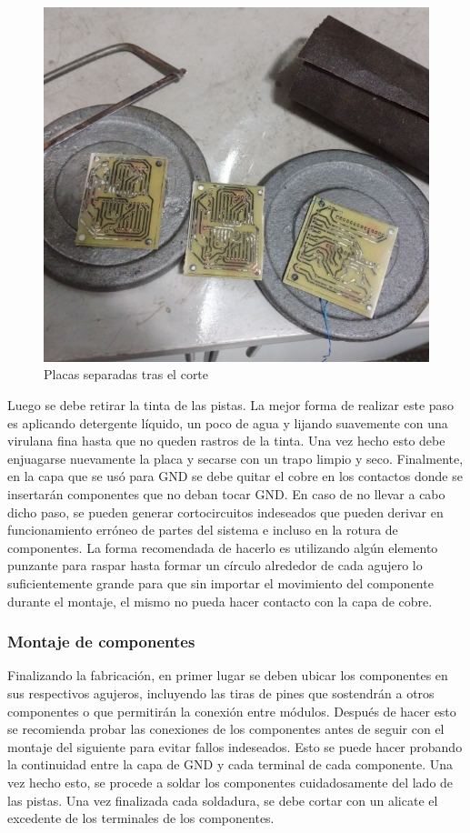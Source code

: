 \begin{figure}[ht!]
	\centering
	\includegraphics[width=0.7\linewidth]{imagenes/pcbeando/pos-corte.jpeg}
	\caption{Placas separadas tras el corte}
	\label{fig:pos-corte}
\end{figure}

Luego se debe retirar la tinta de las pistas. La mejor forma de realizar este paso es aplicando detergente líquido, un poco de agua y lijando suavemente con una virulana fina hasta que no queden rastros de la tinta. Una vez hecho esto debe enjuagarse nuevamente la placa y secarse con un trapo limpio y seco.
Finalmente, en la capa que se usó para GND se debe quitar el cobre en los contactos donde se insertarán componentes que no deban tocar GND. En caso de no llevar a cabo dicho paso, se pueden generar cortocircuitos indeseados que pueden derivar en funcionamiento erróneo de partes del sistema e incluso en la rotura de componentes. La forma recomendada de hacerlo es utilizando algún elemento punzante para raspar hasta formar un círculo alrededor de cada agujero lo suficientemente grande para que sin importar el movimiento del componente durante el montaje, el mismo no pueda hacer contacto con la capa de cobre.


\subsubsection{Montaje de componentes}

Finalizando la fabricación, en primer lugar se deben ubicar los componentes en sus respectivos agujeros, incluyendo las tiras de pines que sostendrán a otros componentes o que permitirán la conexión entre módulos. Después de hacer esto se recomienda probar las conexiones de los componentes antes de seguir con el montaje del siguiente para evitar fallos indeseados. Esto se puede hacer probando la continuidad entre la capa de GND y cada terminal de cada componente. Una vez hecho esto, se procede a soldar los componentes cuidadosamente del lado de las pistas. Una vez finalizada cada soldadura, se debe cortar con un alicate el excedente de los terminales de los componentes.

